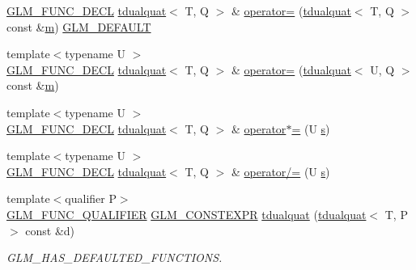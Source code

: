 \begin{DoxyCompactItemize}
\hyperlink{setup_8hpp_ab2d052de21a70539923e9bcbf6e83a51}{G\+L\+M\+\_\+\+F\+U\+N\+C\+\_\+\+D\+E\+CL} \hyperlink{structglm_1_1tdualquat}{tdualquat}$<$ T, Q $>$ \& \hyperlink{structglm_1_1tdualquat_a87cbf5213f512c3b14d9fb53e3314aa8}{operator=} (\hyperlink{structglm_1_1tdualquat}{tdualquat}$<$ T, Q $>$ const \&\hyperlink{_s_d_l__opengl__glext_8h_af593500c283bf1a787a6f947f503a5c2}{m}) \hyperlink{setup_8hpp_aefce7051c376a64ba89fa93a9f63bc2c}{G\+L\+M\+\_\+\+D\+E\+F\+A\+U\+LT}
\item 
{\footnotesize template$<$typename U $>$ }\\\hyperlink{setup_8hpp_ab2d052de21a70539923e9bcbf6e83a51}{G\+L\+M\+\_\+\+F\+U\+N\+C\+\_\+\+D\+E\+CL} \hyperlink{structglm_1_1tdualquat}{tdualquat}$<$ T, Q $>$ \& \hyperlink{structglm_1_1tdualquat_aa657c3d88bec1eff0cb387db5d180c15}{operator=} (\hyperlink{structglm_1_1tdualquat}{tdualquat}$<$ U, Q $>$ const \&\hyperlink{_s_d_l__opengl__glext_8h_af593500c283bf1a787a6f947f503a5c2}{m})
\item 
{\footnotesize template$<$typename U $>$ }\\\hyperlink{setup_8hpp_ab2d052de21a70539923e9bcbf6e83a51}{G\+L\+M\+\_\+\+F\+U\+N\+C\+\_\+\+D\+E\+CL} \hyperlink{structglm_1_1tdualquat}{tdualquat}$<$ T, Q $>$ \& \hyperlink{structglm_1_1tdualquat_ac2a4ef8f0875deefefae629a274efa6e}{operator$\ast$=} (U \hyperlink{_s_d_l__opengl_8h_a4af680a6c683f88ed67b76f207f2e6e4}{s})
\item 
{\footnotesize template$<$typename U $>$ }\\\hyperlink{setup_8hpp_ab2d052de21a70539923e9bcbf6e83a51}{G\+L\+M\+\_\+\+F\+U\+N\+C\+\_\+\+D\+E\+CL} \hyperlink{structglm_1_1tdualquat}{tdualquat}$<$ T, Q $>$ \& \hyperlink{structglm_1_1tdualquat_a608f6681fbff3ab120235c75aac8805b}{operator/=} (U \hyperlink{_s_d_l__opengl_8h_a4af680a6c683f88ed67b76f207f2e6e4}{s})
\item 
{\footnotesize template$<$qualifier P$>$ }\\\hyperlink{setup_8hpp_a33fdea6f91c5f834105f7415e2a64407}{G\+L\+M\+\_\+\+F\+U\+N\+C\+\_\+\+Q\+U\+A\+L\+I\+F\+I\+ER} \hyperlink{setup_8hpp_a08b807947b47031d3a511f03f89645ad}{G\+L\+M\+\_\+\+C\+O\+N\+S\+T\+E\+X\+PR} \hyperlink{structglm_1_1tdualquat_a9dbf71289809c7b43527c0e881601fbb}{tdualquat} (\hyperlink{structglm_1_1tdualquat}{tdualquat}$<$ T, P $>$ const \&d)
\begin{DoxyCompactList}\small\item\em G\+L\+M\+\_\+\+H\+A\+S\+\_\+\+D\+E\+F\+A\+U\+L\+T\+E\+D\+\_\+\+F\+U\+N\+C\+T\+I\+O\+NS. \end{DoxyCompactList}\item 

\end{DoxyCompactItemize}
